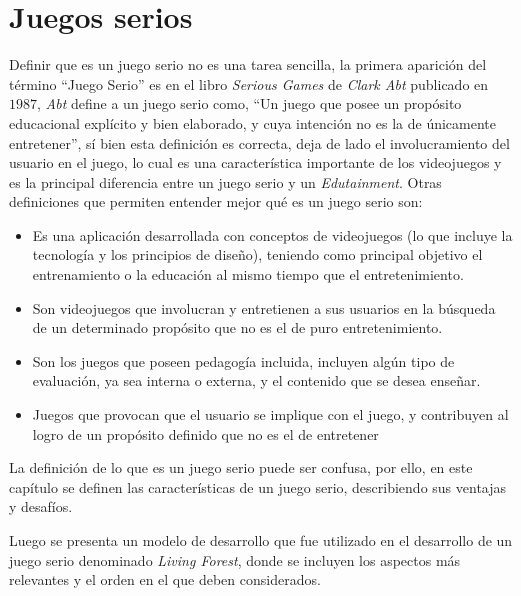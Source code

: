 \chapter{Juegos serios}
\label{chap:juegos_serios}

Definir que es un juego serio no es una tarea sencilla, la primera aparición del
término \enquote{Juego Serio} es en el libro \emph{Serious Games} de \emph{Clark
    Abt} publicado en $1987$\cite{abt1987serious}, \emph{Abt} define a un juego
serio como, \enquote{Un juego que posee un propósito educacional explícito y
    bien elaborado, y cuya intención no es la de únicamente
    entretener}\cite{abt1987serious}, sí bien esta definición es correcta, deja
de lado el involucramiento del usuario en el juego, lo cual es una
característica importante de los videojuegos y es la principal diferencia entre
un juego serio y un \emph{Edutainment}\cite{resnick:2004,charsky:2010}. Otras
definiciones que permiten entender mejor qué es un juego serio son:

\begin{itemize}
    \item Es una aplicación desarrollada con conceptos de videojuegos (lo que
        incluye la tecnología y los principios de diseño), teniendo como
        principal objetivo el entrenamiento o la educación al mismo tiempo que
        el entretenimiento\cite{ludus:sg}.
    \item Son videojuegos que involucran y entretienen a sus usuarios en la
        búsqueda de un determinado propósito que no es el de puro
        entretenimiento\cite{ludus:sg}.
    \item Son los juegos que poseen pedagogía incluida, incluyen algún tipo de
        evaluación, ya sea interna o externa, y el contenido que se desea
        enseñar\cite{damien:sg,sg:aoverview}.
    \item Juegos que provocan que el usuario se implique con el juego, y
        contribuyen al logro de un propósito definido que no es el de
        entretener\cite{sg:aoverview}
\end{itemize}

La definición de lo que es un juego serio puede ser confusa, por ello, en este
capítulo se definen las características de un juego serio, describiendo sus
ventajas y desafíos. 

Luego se presenta un modelo de desarrollo que fue utilizado en el desarrollo de
un juego serio denominado \textit{Living Forest}, donde se incluyen los aspectos
más relevantes y el orden en el que deben considerados.

